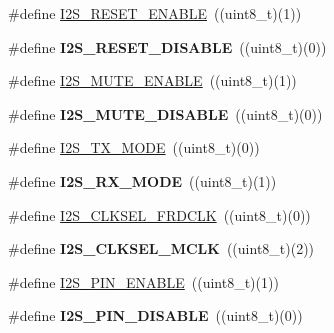 \begin{DoxyCompactItemize}
\item 
\#define \hyperlink{group___i2_s___public___macros_gae090c11fade3a6f9bf9791dba1920556}{\-I2\-S\-\_\-\-R\-E\-S\-E\-T\-\_\-\-E\-N\-A\-B\-L\-E}~((uint8\-\_\-t)(1))
\item 
\hypertarget{group___i2_s___public___macros_gaf008515f40666122bb1936e591b7ed99}{\#define {\bfseries \-I2\-S\-\_\-\-R\-E\-S\-E\-T\-\_\-\-D\-I\-S\-A\-B\-L\-E}~((uint8\-\_\-t)(0))}\label{group___i2_s___public___macros_gaf008515f40666122bb1936e591b7ed99}

\item 
\#define \hyperlink{group___i2_s___public___macros_ga3f418f8bc5e6f401481d3b9e241758bb}{\-I2\-S\-\_\-\-M\-U\-T\-E\-\_\-\-E\-N\-A\-B\-L\-E}~((uint8\-\_\-t)(1))
\item 
\hypertarget{group___i2_s___public___macros_ga7d6c53914dea99eecc1d59eefbdbf5aa}{\#define {\bfseries \-I2\-S\-\_\-\-M\-U\-T\-E\-\_\-\-D\-I\-S\-A\-B\-L\-E}~((uint8\-\_\-t)(0))}\label{group___i2_s___public___macros_ga7d6c53914dea99eecc1d59eefbdbf5aa}

\item 
\#define \hyperlink{group___i2_s___public___macros_ga9a69048cf8ff0576f573ce0605a15753}{\-I2\-S\-\_\-\-T\-X\-\_\-\-M\-O\-D\-E}~((uint8\-\_\-t)(0))
\item 
\hypertarget{group___i2_s___public___macros_gadfd32ed3175e5fa46aef36b3afbca001}{\#define {\bfseries \-I2\-S\-\_\-\-R\-X\-\_\-\-M\-O\-D\-E}~((uint8\-\_\-t)(1))}\label{group___i2_s___public___macros_gadfd32ed3175e5fa46aef36b3afbca001}

\item 
\#define \hyperlink{group___i2_s___public___macros_gafe1dcaaac6d82875528aef5b6f77cc14}{\-I2\-S\-\_\-\-C\-L\-K\-S\-E\-L\-\_\-\-F\-R\-D\-C\-L\-K}~((uint8\-\_\-t)(0))
\item 
\hypertarget{group___i2_s___public___macros_ga6df820e7e7695854c7cf95665432a2a2}{\#define {\bfseries \-I2\-S\-\_\-\-C\-L\-K\-S\-E\-L\-\_\-\-M\-C\-L\-K}~((uint8\-\_\-t)(2))}\label{group___i2_s___public___macros_ga6df820e7e7695854c7cf95665432a2a2}

\item 
\#define \hyperlink{group___i2_s___public___macros_ga5c513203b6ebe05f3c82b7cec3f16a7f}{\-I2\-S\-\_\-P\-I\-N\-\_\-\-E\-N\-A\-B\-L\-E}~((uint8\-\_\-t)(1))
\item 
\hypertarget{group___i2_s___public___macros_ga23c2c8bdfa587ce6a21d59a01cc68e18}{\#define {\bfseries \-I2\-S\-\_\-P\-I\-N\-\_\-\-D\-I\-S\-A\-B\-L\-E}~((uint8\-\_\-t)(0))}\label{group___i2_s___public___macros_ga23c2c8bdfa587ce6a21d59a01cc68e18}


\end{DoxyCompactItemize}
